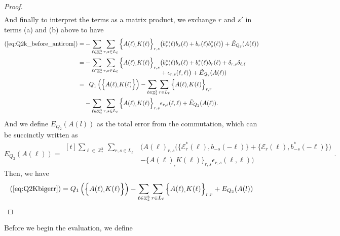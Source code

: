 \documentclass[sn-mathphys,Numbered, a4paper ,nocrop]{sn-jnl}%
\DeclareMathOperator{\Z}{\mathbb{Z}}
\theoremstyle{plain}
\theoremstyle{definition}
\theoremstyle{remark}
\theoremstyle{plain}
\theoremstyle{definition}
\theoremstyle{remark}
\begin{document}
\begin{proof}
\begin{align}
\end{align}
And finally to interpret the terms as a matrix product, we exchange $r$ and $s'$ in terms (a) and (b) above to have 
\begin{alignat}{2}
    (\ref{eq:Q2k_before_anticom}) = &-\sum\limits_{\ell \in \Z^3_*}\sum\limits_{r,s \in L_{\ell}}\Big\{A(\ell)_
        ,K(\ell)\Big\}_{r,s}\big(b^*_{r}(\ell)b_{s}(\ell)+b_{r}(\ell)b^*_{s}(\ell) \big)\nonumber +\tilde E_{Q_2}(A(\ell))\\
        = &-\sum\limits_{\ell \in \Z^3_*}\sum\limits_{r,s \in L_{\ell}}\Big\{A(\ell)_
        ,K(\ell)\Big\}_{r,s}\begin{aligned}[t]
            &\big(b^*_{r}(\ell)b_{s}(\ell)+b^*_{s}(\ell)b_{r}(\ell) + \delta_{r,s}\delta_{\ell,\ell} \\&+ \epsilon_{r,s}(\ell,\ell) \big) +\tilde E_{Q_2}(A(\ell))
        \end{aligned}\\
        =&\phantom{-} Q_1\left(\Big\{A(\ell)_
        ,K(\ell)\Big\}\right)-\sum\limits_{\ell \in \Z^3_*}\sum\limits_{r \in L_{\ell}}\Big\{A(\ell)_
        ,K(\ell)\Big\}_{r,r}\nonumber\\
        &-\sum\limits_{\ell \in \Z^3_*}\sum\limits_{r,s \in L_{\ell}}\Big\{A(\ell)_,K(\ell)\Big\}_{r,s}\epsilon_{r,s}(\ell,\ell)  +\tilde E_{Q_2}(A(\ell)).\label{eq:Q2Kbigerr}
\end{alignat}
And we define $E_{Q_2}(A(l))$ as the total error from the commutation, which can be succinctly written as 
\begin{equation}
    E_{Q_2}(A(\ell)) =\begin{aligned}[t]
        \sum\limits_{\ell \in \Z^3_*}\sum\limits_{r,s \in L_{\ell}}&\Big(A(\ell)_{r,s}\big(\big\{\mathcal{E}^*_{r}(\ell), b_{-s}(-\ell)\big\} + \big\{\mathcal{E}_r(\ell), b^*_{-s}(-\ell)\big\}\big)\\&-\big\{A(\ell)_,K(\ell)\big\}_{r,s}\epsilon_{r,s}(\ell,\ell)\Big)
    \end{aligned} .  
\end{equation}
Then, we have 
\begin{equation}
    (\ref{eq:Q2Kbigerr}) = Q_1\left(\Big\{A(\ell)_
        ,K(\ell)\Big\}\right)-\sum\limits_{\ell \in \Z^3_*}\sum\limits_{r \in L_{\ell}}\Big\{A(\ell)_
        ,K(\ell)\Big\}_{r,r} + E_{Q_2}(A(l)) 
\end{equation}
\end{proof}
Before we begin the evaluation, we define\newline
\end{document}
